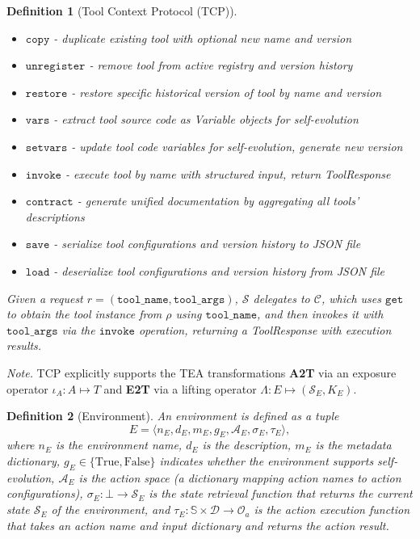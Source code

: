 \documentclass[11pt]{article}
\newtheorem{definition}{Definition}
\begin{document}
\begin{definition}[Tool Context Protocol (TCP)]
\begin{itemize}[leftmargin=*,itemsep=0.1em]
\begin{itemize}[leftmargin=*,itemsep=0.05em]
      \item $\mathtt{copy}$ - duplicate existing tool with optional new name and version
      \item $\mathtt{unregister}$ - remove tool from active registry and version history
      \item $\mathtt{restore}$ - restore specific historical version of tool by name and version
      \item $\mathtt{vars}$ - extract tool source code as Variable objects for self-evolution
      \item $\mathtt{setvars}$ - update tool code variables for self-evolution, generate new version
      \item $\mathtt{invoke}$ - execute tool by name with structured input, return ToolResponse
      \item $\mathtt{contract}$ - generate unified documentation by aggregating all tools' descriptions
      \item $\mathtt{save}$ - serialize tool configurations and version history to JSON file
      \item $\mathtt{load}$ - deserialize tool configurations and version history from JSON file
    \end{itemize}
  \end{itemize}
  Given a request $r = (\mathtt{tool\_name}, \mathtt{tool\_args})$, $\mathcal{S}$ delegates to $\mathcal{C}$, which uses $\mathtt{get}$ to obtain the tool instance from $\rho$ using $\mathtt{tool\_name}$, and then invokes it with $\mathtt{tool\_args}$ via the $\mathtt{invoke}$ operation, returning a ToolResponse with execution results.
\end{definition}

\noindent\textit{Note.} TCP explicitly supports the TEA transformations \textbf{A2T} via an exposure operator $\iota_A: A\mapsto T$ and \textbf{E2T} via a lifting operator $\Lambda: E\mapsto (\mathcal{S}_E, K_E)$.

\begin{definition}[Environment]
  An environment is defined as a tuple
  \[ E = \langle n_E, d_E, m_E, g_E, \mathcal{A}_E, \sigma_E, \tau_E \rangle, \]
  where $n_E$ is the environment name, $d_E$ is the description, $m_E$ is the metadata dictionary, $g_E \in \{\mathrm{True}, \mathrm{False}\}$ indicates whether the environment supports self-evolution, $\mathcal{A}_E$ is the action space (a dictionary mapping action names to action configurations), $\sigma_E: \bot \to \mathcal{S}_E$ is the state retrieval function that returns the current state $\mathcal{S}_E$ of the environment, and $\tau_E: \mathbb{S} \times \mathcal{D} \to \mathcal{O}_a$ is the action execution function that takes an action name and input dictionary and returns the action result.
  \end{definition}
  
\end{document}
